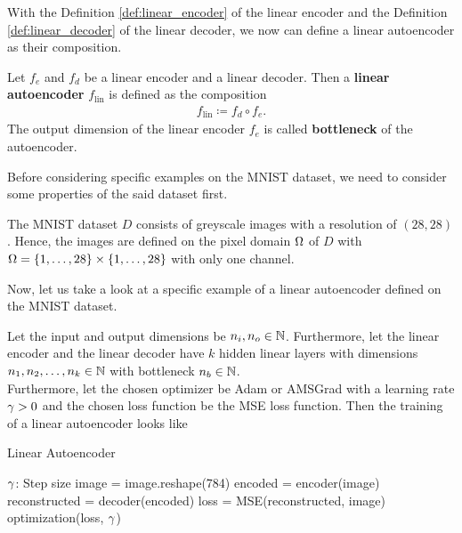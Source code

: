 With the Definition \ref{def:linear_encoder} of the linear encoder and the Definition \ref{def:linear_decoder} of the linear decoder, we now can define a linear autoencoder as their composition.

\begin{definition}
Let $f_e$ and $f_d$ be a linear encoder and a linear decoder. Then a \textbf{linear autoencoder} $f_{\text{lin}}$ is defined as the composition
\begin{align*}
f_{\text{lin}} \coloneqq f_d \circ f_e.
\end{align*}
The output dimension of the linear encoder $f_e$ is called \textbf{bottleneck} of the autoencoder.
\end{definition}

Before considering specific examples on the MNIST dataset, we need to consider some properties of the said dataset first.

\begin{remark}\label{remark:mnist}
The MNIST dataset $D$ consists of greyscale images with a resolution of $(28,28)$. Hence, the images are defined on the pixel domain $\Omega$ of $D$ with $\Omega=\{1,\ldots,28\}\times\{1,\ldots,28\}$ with only one channel.
\end{remark}

Now, let us take a look at a specific example of a linear autoencoder defined on the MNIST dataset.

\begin{algorithm}
Let the input and output dimensions be $n_i, n_o \in\operatorname{\mathbb{N}}$. Furthermore, let the linear encoder and the linear decoder have $k$ hidden linear layers with dimensions $n_1, n_2,\ldots, n_k\in\operatorname{\mathbb{N}}$ with bottleneck $n_b\in\operatorname{\mathbb{N}}$.\\
Furthermore, let the chosen optimizer be Adam or AMSGrad with a learning rate $\operatorname{\gamma}>0$ and the chosen loss function be the MSE loss function. Then the training of a linear autoencoder looks like
\caption{Linear Autoencoder}\label{alg:linear_AE}
\begin{algorithmic}[1]
\Require $\operatorname{\gamma}$: Step size
		\State image = image.reshape(784) 
	    \State encoded = encoder(image) 
		\State reconstructed = decoder(encoded) 
    	\State loss = MSE(reconstructed, image) 
	    \State optimization(loss, $\operatorname{\gamma}$) 
    \EndFor
\EndFor
\end{algorithmic}
\end{algorithm}


